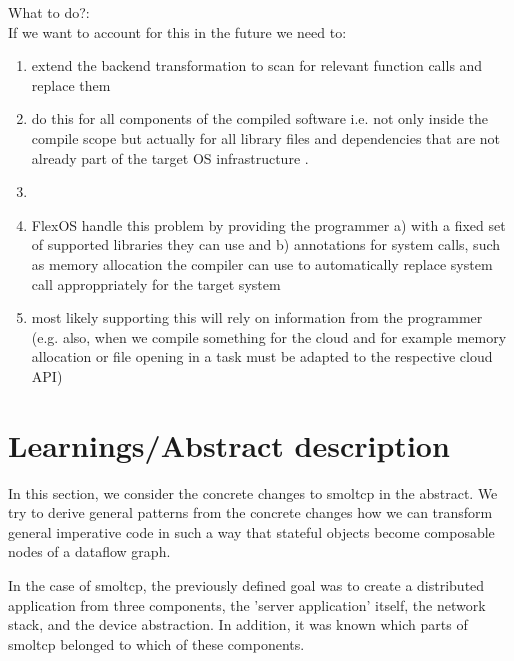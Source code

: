 What to do?:\\
If we want to account for this in the future we need to:
\begin{enumerate}
    \item extend the backend transformation to scan for relevant function calls and replace them
    \item do this for all components of the compiled software i.e. not only inside the compile scope but actually for all library files and dependencies that are not already part of the target OS infrastructure
    .  
    \item {}
    \item FlexOS  handle this problem by providing the programmer a) with a fixed set of supported libraries they can use and b) annotations for system calls, such as memory allocation the compiler can use to automatically replace system call approppriately for the target system
    \item \means most likely supporting this will rely on information from the programmer (e.g. also, when we compile something for the cloud and for example memory allocation or file opening in a task must be adapted to the respective cloud API)
\end{enumerate}


\section{Learnings/Abstract description}
In this section, we consider the concrete changes to smoltcp in the abstract. We try to derive general patterns from the concrete changes how we can transform general imperative code in such a way that stateful objects become composable nodes of a dataflow graph. 

In the case of smoltcp, the previously defined goal was to create a distributed application from three components, the 'server application' itself, the network stack, and the device abstraction. In addition, it was known which parts of smoltcp belonged to which of these components.

